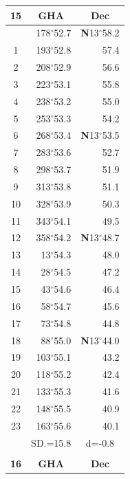 \documentclass[10pt, a4paper]{report}
\begin{document}
\begin{scriptsize}
\noindent
\begin{tabular*}{0.2\textwidth}[t]{@{\extracolsep{\fill}}|c|rr|}
\hline
\multicolumn{1}{|c|}{\rule{0pt}{2.6ex}\textbf{15}} & \multicolumn{1}{c}{\textbf{GHA}} & \multicolumn{1}{c|}{\textbf{Dec}}\\
\hline\rule{0pt}{2.6ex}\noindent
0 & 178$^\circ$52.7 & \textbf{N}13$^\circ$58.2\\
1 & 193$^\circ$52.8 & 57.4\\
2 & 208$^\circ$52.9 & 56.6\\
3 & 223$^\circ$53.1 & \raisebox{0.24ex}{\boldmath$\cdot$~\boldmath$\cdot$~~}55.8\\
4 & 238$^\circ$53.2 & 55.0\\
5 & 253$^\circ$53.3 & 54.2\\[2Pt]
6 & 268$^\circ$53.4 & \textbf{N}13$^\circ$53.5\\
7 & 283$^\circ$53.6 & 52.7\\
8 & 298$^\circ$53.7 & 51.9\\
9 & 313$^\circ$53.8 & \raisebox{0.24ex}{\boldmath$\cdot$~\boldmath$\cdot$~~}51.1\\
10 & 328$^\circ$53.9 & 50.3\\
11 & 343$^\circ$54.1 & 49.5\\[2Pt]
12 & 358$^\circ$54.2 & \textbf{N}13$^\circ$48.7\\
13 & 13$^\circ$54.3 & 48.0\\
14 & 28$^\circ$54.5 & 47.2\\
15 & 43$^\circ$54.6 & \raisebox{0.24ex}{\boldmath$\cdot$~\boldmath$\cdot$~~}46.4\\
16 & 58$^\circ$54.7 & 45.6\\
17 & 73$^\circ$54.8 & 44.8\\[2Pt]
18 & 88$^\circ$55.0 & \textbf{N}13$^\circ$44.0\\
19 & 103$^\circ$55.1 & 43.2\\
20 & 118$^\circ$55.2 & 42.4\\
21 & 133$^\circ$55.3 & \raisebox{0.24ex}{\boldmath$\cdot$~\boldmath$\cdot$~~}41.6\\
22 & 148$^\circ$55.5 & 40.9\\
23 & 163$^\circ$55.6 & 40.1\\
\hline
\rule{0pt}{2.4ex} & \multicolumn{1}{c}{SD.=15.8} & \multicolumn{1}{c|}{d=-0.8}\\
\hline
\multicolumn{1}{c}{}\\[-0.5ex]\hline
\multicolumn{1}{|c|}{\rule{0pt}{2.6ex}\textbf{16}} & \multicolumn{1}{c}{\textbf{GHA}} & \multicolumn{1}{c|}{\textbf{Dec}}\\

\end{tabular*}
\end{scriptsize}
\end{document}
